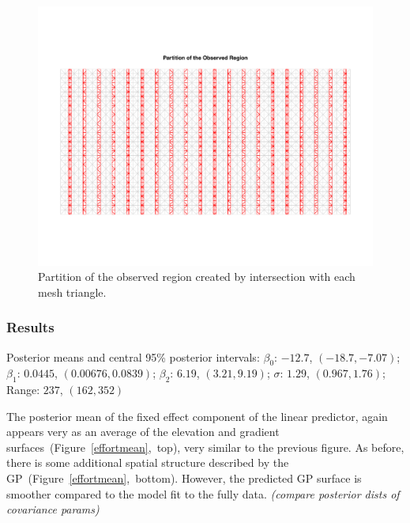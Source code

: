 \documentclass[]{interact}
\begin{document}
\begin{figure}[h]
\includegraphics[width=\textwidth]{figures/bei-effort_partition.pdf}
\caption{Partition of the observed region created by intersection with each
mesh triangle.}
\label{effortpartition}
\end{figure}

\subsubsection{Results}

Posterior means and central 95\% posterior intervals:
\(\beta_{0}\): \(-12.7\), \((-18.7, -7.07)\);
\(\beta_{1}\): \(0.0445\), \((0.00676, 0.0839)\);
\(\beta_{2}\): \(6.19\), \((3.21, 9.19)\);
\(\sigma\): \(1.29\), \((0.967, 1.76)\);
Range: \(237\), \((162, 352)\)

The posterior mean of the fixed effect component of the linear predictor,
again appears very as an average of the elevation and gradient
surfaces~(Figure~\ref{effortmean},~top), very similar to the previous figure.
As before, there is some additional spatial structure described by the
GP~(Figure~\ref{effortmean},~bottom). However, the predicted GP surface is
smoother compared to the model fit to the fully data.
{\it (compare posterior dists of covariance params)}
\end{document}
